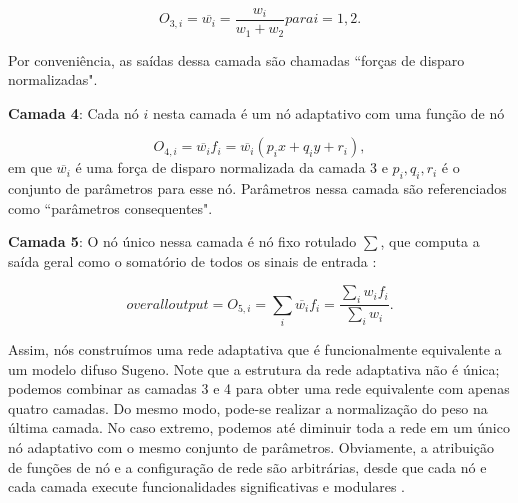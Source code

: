 \begin{equation}
\label{eq:layer3anfis}
O_{3,i} = \overline{w_i} = \frac{w_i}{w_1 + w_2} para i = 1,2. 
\end{equation}

Por conveniência, as saídas dessa camada são chamadas ``forças de disparo normalizadas".

\textbf{Camada 4}: Cada nó $i$ nesta camada é um nó adaptativo com uma função de nó \label{symbol:anfis5}

\begin{equation}
\label{eq:layer4anfis}
O_{4,i} = \overline{w_i}f_i = \overline{w_i}(p_ix + q_iy + r_i), 
\end{equation}
em que $\overline{w_i}$ é uma força de disparo normalizada da camada 3 e ${p_i, q_i, r_i}$ é o conjunto de parâmetros para esse nó. Parâmetros nessa camada são referenciados como ``parâmetros consequentes".

\textbf{Camada 5}: O nó único nessa camada é nó fixo rotulado $\sum$, que computa a saída geral como o somatório de todos os sinais de entrada \label{symbol:anfis6}:

\begin{equation}
\label{eq:layer5anfis}
overalloutput = O_{5,i} = \sum\limits_{i}\overline{w_i}f_i = \frac{\sum_{i} w_if_i}{\sum_{i}w_i}.
\end{equation}

Assim, nós construímos uma rede adaptativa que é funcionalmente equivalente a um modelo difuso Sugeno. Note que a estrutura da rede adaptativa não é única; podemos combinar as camadas 3 e 4 para obter uma rede equivalente com apenas quatro camadas. Do mesmo modo, pode-se realizar a normalização do peso na última camada. No caso extremo, podemos até diminuir toda a rede em um único nó adaptativo com o mesmo conjunto de parâmetros. Obviamente, a atribuição de funções de nó e a configuração de rede são arbitrárias, desde que cada nó e cada camada execute funcionalidades significativas e modulares \cite{jang1997neuro}.

